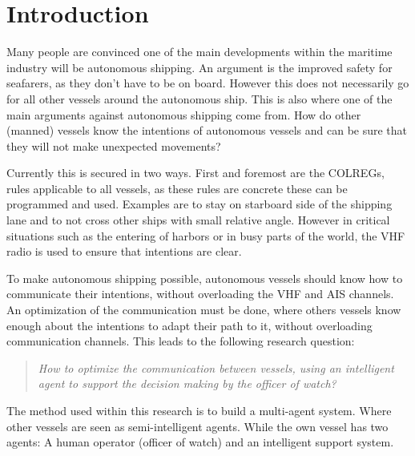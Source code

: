 \chapter*{Introduction}

Many people are convinced one of the main developments within the maritime industry will be autonomous shipping. An argument is the improved safety for seafarers, as they don't have to be on board. However this does not necessarily go for all other vessels around the autonomous ship. This is also where one of the main arguments against autonomous shipping come from. How do other (manned) vessels know the intentions of autonomous vessels and can be sure that they will not make unexpected movements?

Currently this is secured in two ways. First and foremost are the COLREGs, rules applicable to all vessels, as these rules are concrete these can be programmed and used. Examples are to stay on starboard side of the shipping lane and to not cross other ships with small relative angle. However in critical situations such as the entering of harbors or in busy parts of the world, the VHF radio is used to ensure that intentions are clear.

To make autonomous shipping possible, autonomous vessels should know how to communicate their intentions, without overloading the VHF and AIS channels. An optimization of the communication must be done, where others vessels know enough about the intentions to adapt their path to it, without overloading communication channels.
This leads to the following research question:

\begin{quotation}
	\emph{How to optimize the communication between vessels, using an intelligent agent to support the decision making by the officer of watch?}
\end{quotation}

The method used within this research is to build a multi-agent system. Where other vessels are seen as semi-intelligent agents. While the own vessel has two agents: A human operator (officer of watch) and an intelligent support system. 



